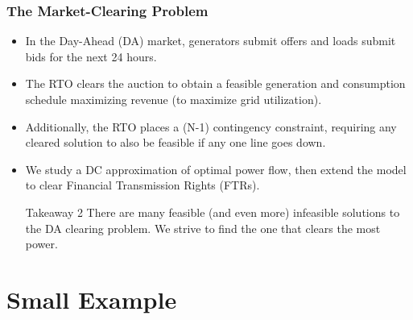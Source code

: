 \documentclass[
    11pt,
]{beamer}
\begin{document}
\begin{frame}
    \frametitle{The Market-Clearing Problem}
    \small

    \begin{itemize}
        \item In the \alert{Day-Ahead (DA) market}, generators submit offers and loads submit bids for the next 24 hours.
        \item The RTO \alert{clears} the auction to obtain a feasible generation and consumption schedule maximizing revenue (to maximize grid utilization).
        \item Additionally, the RTO places a \alert{(N-1) contingency constraint}, requiring any cleared solution to also be feasible if any one line goes down. 
        \item We study a DC approximation of optimal power flow, then extend the model to clear \alert{Financial Transmission Rights (FTRs)}.

        \vspace{0.2em}
        \begin{block}{Takeaway 2}
            There are many feasible (and even more) infeasible solutions to the DA clearing problem. We strive to find the one that clears the most power.
        \end{block}
    \end{itemize}
\end{frame}


\section{Small Example}
\end{document}
